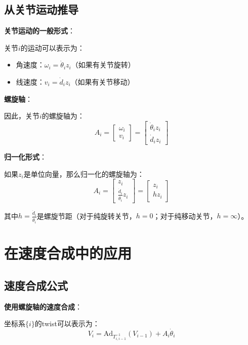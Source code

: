 \documentclass[12pt,a4paper]{article}
\begin{document}
\subsection{从关节运动推导}

\textbf{关节运动的一般形式}：

关节$i$的运动可以表示为：
\begin{itemize}
\item 角速度：$\omega_i = \dot{\theta}_i z_i$（如果有关节旋转）
\item 线速度：$v_i = \dot{d}_i z_i$（如果有关节移动）
\end{itemize}

\textbf{螺旋轴}：

因此，关节$i$的螺旋轴为：
\begin{equation}
A_i = \begin{bmatrix} \omega_i \\ v_i \end{bmatrix} = \begin{bmatrix} \dot{\theta}_i z_i \\ \dot{d}_i z_i \end{bmatrix}
\end{equation}

\textbf{归一化形式}：

如果$z_i$是单位向量，那么归一化的螺旋轴为：
\begin{equation}
A_i = \begin{bmatrix} z_i \\ \frac{\dot{d}_i}{\dot{\theta}_i} z_i \end{bmatrix} = \begin{bmatrix} z_i \\ h z_i \end{bmatrix}
\end{equation}

其中$h = \frac{\dot{d}_i}{\dot{\theta}_i}$是螺旋节距（对于纯旋转关节，$h = 0$；对于纯移动关节，$h = \infty$）。

\section{在速度合成中的应用}

\subsection{速度合成公式}

\textbf{使用螺旋轴的速度合成}：

坐标系$\{i\}$的twist可以表示为：
\begin{equation}
V_i = \text{Ad}_{T_{i,i-1}^{-1}}(V_{i-1}) + A_i \dot{\theta}_i
\end{equation}
\end{document}

